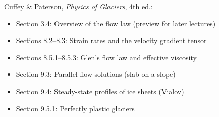 \documentclass[11pt]{article}
\begin{document}
Cuffey \& Paterson, \textit{Physics of Glaciers}, 4th ed.:
\begin{itemize}
  \item Section 3.4: Overview of the flow law (preview for later lectures)
  \item Sections 8.2--8.3: Strain rates and the velocity gradient tensor
  \item Sections 8.5.1--8.5.3: Glen's flow law and effective viscosity
  \item Section 9.3: Parallel-flow solutions (slab on a slope)
  \item Section 9.4: Steady-state profiles of ice sheets (Vialov)
  \item Section 9.5.1: Perfectly plastic glaciers
\end{itemize}



\end{document}
